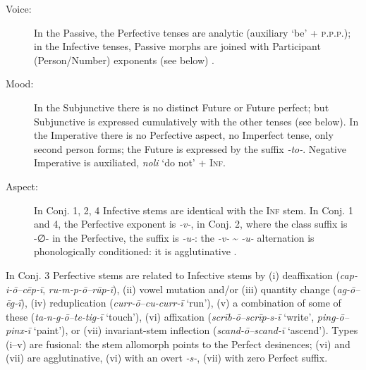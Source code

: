 \documentclass[output=paper, colorlinks,citecolor=brown]{langsci/langscibook}
\begin{document}
\begin{description}
\item[Voice:] In the Passive, the Perfective tenses are analytic (auxiliary ‘be' + \textsc{p.p.p.}); in the Infective tenses, Passive morphs are joined with Participant (Person\slash Number) exponents (see below) . 

\item[Mood:] In the Subjunctive there is no distinct Future or Future perfect;  but Subjunctive is expressed cumulatively with the other tenses (see below). In the Imperative there is no Perfective aspect, no Imperfect tense, only second person forms; the Future is expressed by the suffix \textit{-to-}. Negative Imperative is auxiliated, \textit{noli} ‘do not' + \textsc{Inf}.

\item[Aspect:] In Conj. 1, 2, 4 Infective stems are identical with the \textsc{Inf} stem. In Conj. 1 and 4, the Perfective exponent is \textit{-v-}, in Conj. 2, where the class suffix is -∅- in the Perfective, the suffix is \textit{-u-}: the \textit{-v-} {\textasciitilde} \textit{-u-} alternation is phonologically conditioned: it is agglutinative . 
\end{description}

In Conj. 3 Perfective stems are related to Infective stems by (i) deaffixation (\textit{cap-i-ō–cēp-ī}, \textit{ru-m-p-ō–rūp-ī}), (ii) vowel mutation and/or (iii) quantity change (\textit{ag-ō–ēg-ī}), (iv) reduplication (\textit{curr-ō–cu-curr-ī} `run'), (v) a combination of some of these (\textit{ta-n-g-ō–te-tig-ī} `touch'), (vi) affixation (\textit{scrīb-ō–scrīp-s-ī} `write', \textit{ping-ō–pinx-ī} `paint'), or (vii) invariant-stem inflection (\textit{scand-ō–scand-ī} `ascend'). Types (i–v) are fusional: the stem allomorph points to the Perfect desinences; (vi) and (vii) are agglutinative, (vi) with an overt \textit{-s-}, (vii) with zero Perfect suffix. 
\end{document}
